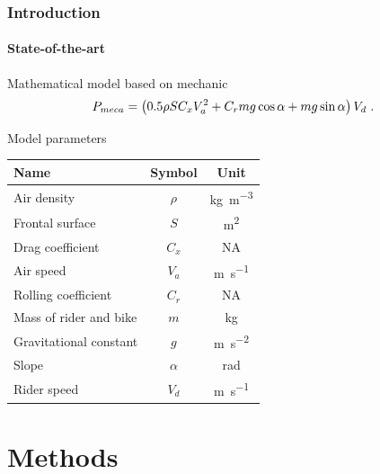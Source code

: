 \documentclass{beamer}
\begin{document}
\begin{frame}
  \frametitle{Introduction}
  \framesubtitle{State-of-the-art}
  \begin{block}{\small Mathematical model based on mechanic}
    \begin{equation}
      \small
      \label{eq:eq1}
      P_{meca} = \left( 0.5 \rho S C_{x} V_{a}^{2} + C_{r} m g \cos \alpha + m g \sin
        \alpha \right) V_{d} \ .
    \end{equation}
  \end{block}
  \begin{block}{\small Model parameters}
    \begin{table}
      \centering
      \scriptsize
      \begin{tabular}{lcc}
        \toprule
        \textbf{Name} & \textbf{Symbol} & \textbf{Unit} \\
        \midrule
        Air density & $\rho$ & \si{\kilo\gram\per\cubic\meter} \\
        Frontal surface & $S$ & \si{\meter\squared} \\
        Drag coefficient & $C_{x}$ & NA\\
        Air speed & $V_{a}$ & \si{\meter\per\second} \\
        Rolling coefficient & $C_{r}$ & NA \\
        Mass of rider and bike & $m$ & \si{\kilo\gram} \\
        Gravitational constant & $g$ & \si{\meter\per\second\squared} \\
        Slope & $\alpha$ & \si{\radian} \\
        Rider speed & $V_{d}$ & \si{\meter\per\second} \\
        \bottomrule
      \end{tabular}
    \end{table}
  \end{block}
\end{frame}


\section{Methods}
\end{document}
